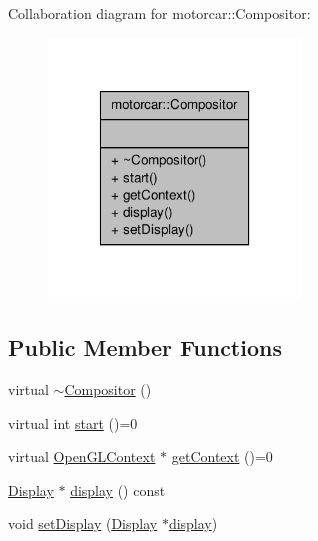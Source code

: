 Collaboration diagram for motorcar\-:\-:Compositor\-:
\nopagebreak
\begin{figure}[H]
\begin{center}
\leavevmode
\includegraphics[width=190pt]{classmotorcar_1_1Compositor__coll__graph}
\end{center}
\end{figure}
\subsection*{Public Member Functions}
\begin{DoxyCompactItemize}
\item 
virtual \hyperlink{classmotorcar_1_1Compositor_ab9963bdfdd7deafdaec1a5ebf8f2d97b}{$\sim$\-Compositor} ()
\item 
virtual int \hyperlink{classmotorcar_1_1Compositor_a9d4b703e99386360996087a1100fae52}{start} ()=0
\item 
virtual \hyperlink{classmotorcar_1_1OpenGLContext}{Open\-G\-L\-Context} $\ast$ \hyperlink{classmotorcar_1_1Compositor_afb0a16529f65b5e2ecf8f15524680c57}{get\-Context} ()=0
\item 
\hyperlink{classmotorcar_1_1Display}{Display} $\ast$ \hyperlink{classmotorcar_1_1Compositor_a101830d8941b3d51a57e224950240cfe}{display} () const 
\item 
void \hyperlink{classmotorcar_1_1Compositor_a432fe3ad3e6ff3e22c61b3dc98f719f6}{set\-Display} (\hyperlink{classmotorcar_1_1Display}{Display} $\ast$\hyperlink{classmotorcar_1_1Compositor_a101830d8941b3d51a57e224950240cfe}{display})
\end{DoxyCompactItemize}


